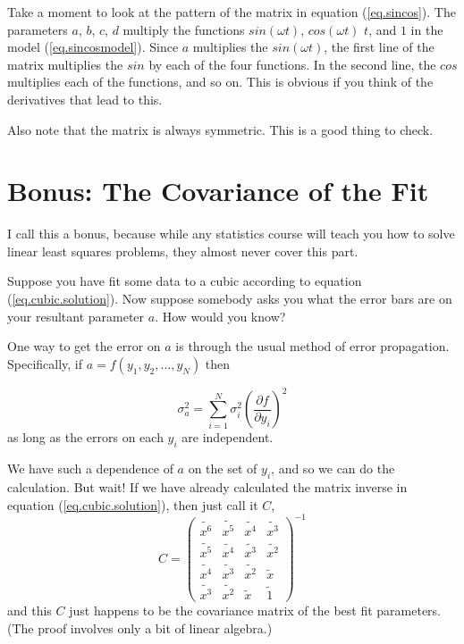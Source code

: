 \documentclass[letterpaper,12pt]{article}
\newcommand{\myMatrix}[1]{\bm{\mathit{#1}}}
\begin{document}
Take a moment to look at the pattern of the matrix in equation (\ref{eq.sincos}). The parameters $a$, $b$, $c$, $d$ multiply the functions $sin(\omega t)$, $cos(\omega t)$ $t$, and $1$ in the model (\ref{eq.sincosmodel}). Since $a$ multiplies the $sin(\omega t)$, the first line of the matrix multiplies the $sin$ by each of the four functions. In the second line, the $cos$ multiplies each of the functions, and so on. This is obvious if you think of the derivatives that lead to this.

Also note that the matrix is always symmetric. This is a good thing to check.

\section{Bonus: The Covariance of the Fit}

I call this a bonus, because while any statistics course will teach you how to solve linear least squares problems, they almost never cover this part.

Suppose you have fit some data to a cubic according to equation (\ref{eq.cubic.solution}).  Now suppose somebody asks you what the error bars are on your resultant parameter $a$.  How would you know?

One way to get the error on $a$ is through the usual method of error propagation. Specifically, if $a=f(y_1,y_2,...,y_N)$ then 

\begin{equation}
\sigma_a^2=\sum_{i=1}^N \sigma_i^2(\frac{\partial f}{\partial y_i})^2
\end{equation}
as long as the errors on each $y_i$ are independent.

We have such a dependence of $a$ on the set of $y_i$, and so we can do the calculation.  But wait!  If we have already calculated the matrix inverse in equation (\ref{eq.cubic.solution}), then just call it $\myMatrix{C}$,
\begin{equation}
\myMatrix{C}=\begin{pmatrix}
\widetilde{x^6} & \widetilde{x^5} & \widetilde{x^4} & \widetilde{x^3} \\
\widetilde{x^5} & \widetilde{x^4} & \widetilde{x^3} & \widetilde{x^2} \\
\widetilde{x^4} & \widetilde{x^3} & \widetilde{x^2} & \widetilde{x} \\
\widetilde{x^3} & \widetilde{x^2} & \widetilde{x} & \widetilde{1} 
\end{pmatrix} ^{-1}
\end{equation}
and this $\myMatrix{C}$ just happens to be the covariance matrix of the best fit parameters. (The proof involves only a bit of linear algebra.)
\end{document}
